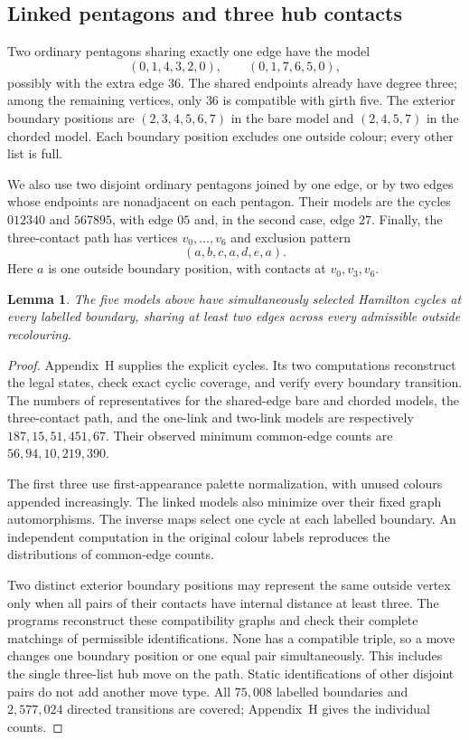 \documentclass[11pt]{article}
\newtheorem{lemma}[theorem]{Lemma}
\theoremstyle{remark}
\numberwithin{equation}{section}
\numberwithin{table}{section}
\begin{document}
\subsection{Linked pentagons and three hub contacts}

Two ordinary pentagons sharing exactly one edge have the model
\[
 (0,1,4,3,2,0),\qquad (0,1,7,6,5,0),
\]
possibly with the extra edge $36$. The shared endpoints already have
degree three; among the remaining vertices, only $36$ is compatible
with girth five. The exterior boundary positions are $(2,3,4,5,6,7)$ in the bare
model and $(2,4,5,7)$ in the chorded model. Each boundary position excludes one
outside colour; every other list is full.

We also use two disjoint ordinary pentagons joined by one edge, or by
two edges whose endpoints are nonadjacent on each pentagon. Their
models are the cycles $012340$ and $567895$, with edge $05$ and,
in the second case, edge $27$. Finally, the three-contact path has
vertices $v_0,\ldots,v_6$ and exclusion pattern
\[
 (a,b,c,a,d,e,a).
\]
Here $a$ is one outside boundary position, with contacts at $v_0,v_3,v_6$.

\begin{lemma}\label{lem:extended-cycle-data}
The five models above have simultaneously selected Hamilton cycles
at every labelled boundary, sharing at least two edges across every
admissible outside recolouring.
\end{lemma}
\begin{proof}
Appendix~H supplies the explicit cycles. Its two computations
reconstruct the legal states, check exact cyclic coverage, and verify
every boundary transition. The numbers of representatives for the shared-edge
bare and chorded models, the three-contact path, and the one-link and
two-link models are respectively $187,15,51,451,67$. Their observed
minimum common-edge counts are $56,94,10,219,390$.

The first three use first-appearance palette normalization, with unused
colours appended increasingly. The linked models also minimize over
their fixed graph automorphisms. The inverse maps select one cycle at
each labelled boundary. An independent computation in the original colour labels reproduces
the distributions of common-edge counts.

Two distinct exterior boundary positions may represent the same outside
vertex only when all pairs of their contacts have internal distance at
least three. The programs reconstruct
these compatibility graphs and check their complete matchings of permissible identifications.
None has a compatible triple, so a move changes one boundary position or one equal
pair simultaneously. This includes the single three-list hub move on
the path. Static identifications of other disjoint pairs do not add
another move type. All $75{,}008$ labelled boundaries and $2{,}577{,}024$
directed transitions are covered; Appendix~H gives the individual counts.
\end{proof}
\end{document}
